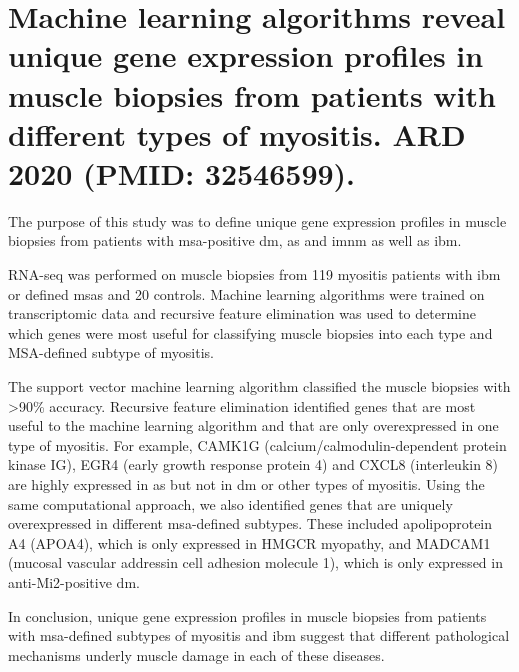 \section{Machine learning algorithms reveal unique gene expression profiles in muscle biopsies from patients with different types of myositis. ARD 2020 (PMID: 32546599).}
\label{sec:rnaseq_ml}

The purpose of this study was to define unique gene expression profiles in muscle biopsies from patients with \gls{msa}-positive \gls{dm}, \gls{as} and \gls{imnm} as well as \gls{ibm}.

RNA-seq was performed on muscle biopsies from 119 myositis patients with \gls{ibm} or defined \gls{msa}s and 20 controls. Machine learning algorithms were trained on transcriptomic data and recursive feature elimination was used to determine which genes were most useful for classifying muscle biopsies into each type and MSA-defined subtype of myositis.

The support vector machine learning algorithm classified the muscle biopsies with >90\% accuracy. Recursive feature elimination identified genes that are most useful to the machine learning algorithm and that are only overexpressed in one type of myositis.
For example, CAMK1G (calcium/calmodulin-dependent protein kinase IG), EGR4 (early growth response protein 4) and CXCL8 (interleukin 8) are highly expressed in \gls{as} but not in \gls{dm} or other types of myositis. Using the same computational approach, we also identified genes that are uniquely overexpressed in different \gls{msa}-defined subtypes. These included apolipoprotein A4 (APOA4), which is only expressed in HMGCR myopathy, and MADCAM1 (mucosal vascular addressin cell adhesion molecule 1), which is only expressed in anti-Mi2-positive \gls{dm}.

In conclusion, unique gene expression profiles in muscle biopsies from patients with \gls{msa}-defined subtypes of myositis and \gls{ibm} suggest that different pathological mechanisms underly muscle damage in each of these diseases.

